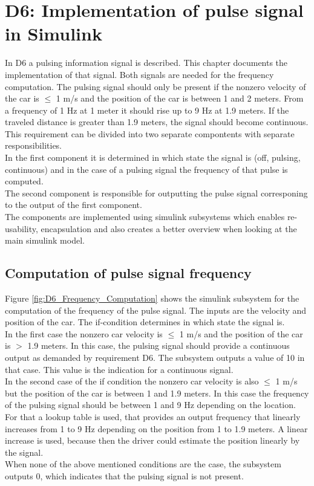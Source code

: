 \chapter{D6: Implementation of pulse signal in Simulink}\label{cha:D6}

In D6 a pulsing information signal is described. This chapter documents the implementation of that signal.
Both signals are needed for the frequency computation.
The pulsing signal should only be present if the nonzero velocity of the car is $\leq$ 1 m/s and the position of the car is between 1 and 2 meters. From a frequency of 1 Hz at 1 meter it should rise up to 9 Hz at 1.9 meters. If the traveled distance is greater than 1.9 meters, the signal should become continuous.\\
This requirement can be divided into two separate compontents with separate responsibilities.\\
In the first component it is determined in which state the signal is (off, pulsing, continuous) and in the case of a pulsing signal the frequency of that pulse is computed.\\
The second component is responsible for outputting the pulse signal corresponing to the output of the first component.\\
The components are implemented using simulink subsystems which enables re-usability, encapsulation and also creates a better overview when looking at the main simulink model.\\
\section{Computation of pulse signal frequency}\label{sec:D6Frequency}
Figure \ref{fig:D6_Frequency_Computation} shows the simulink subsystem for the computation of the frequency of the pulse signal.
The inputs are the velocity and position of the car.
The if-condition determines in which state the signal is.\\
In the first case the nonzero car velocity is $\leq$ 1 m/s and the position of the car is $>$ 1.9 meters.
In this case, the pulsing signal should provide a continuous output as demanded by requirement D6.
The subsystem outputs a value of 10 in that case.
This value is the indication for a continuous signal.\\
In the second case of the if condition the nonzero car velocity is also $\leq$ 1 m/s but the position of the car is between 1 and 1.9 meters.
In this case the frequency of the pulsing signal should be between 1 and 9 Hz depending on the location.
For that a lookup table is used, that provides an output frequency that linearly increases from 1 to 9 Hz depending on the position from 1 to 1.9 meters. A linear increase is used, because then the driver could estimate the position linearly by the signal.\\
When none of the above mentioned conditions are the case, the subsystem outputs 0, which indicates that the pulsing signal is not present.

